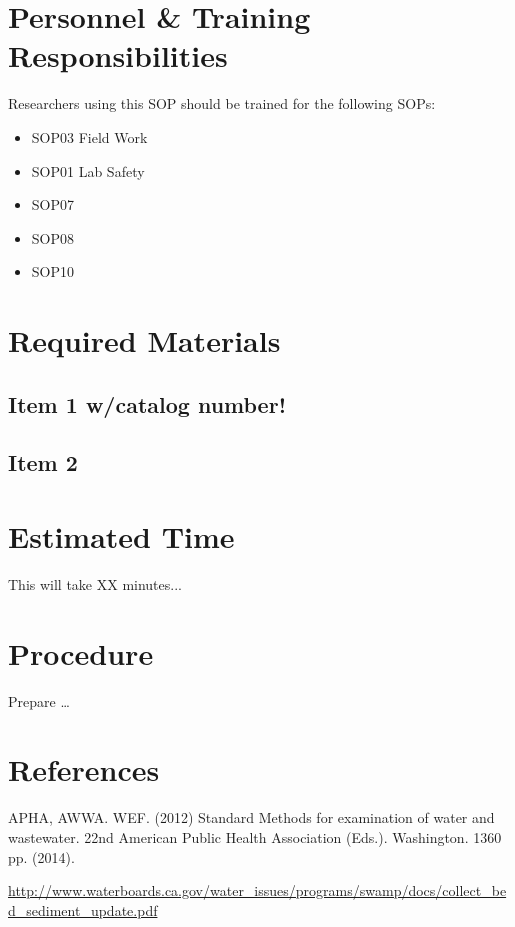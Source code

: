 \documentclass[12pt]{../SOP3_beta}
\begin{document}
\section{Personnel \& Training Responsibilities}

Researchers using this SOP should be trained for the following SOPs:

\begin{itemize}
  \item SOP03 Field Work
  \item SOP01 Lab Safety
  \item SOP07
  \item SOP08
  \item SOP10
\end{itemize}

\section{Required Materials}

\subsection{Item 1 w/catalog number!}
\subsection{Item 2}

\section{Estimated Time}

\NP This will take XX minutes...

\section{Procedure}

\NP Prepare \dots

\NP

\section{References}

\NP APHA, AWWA. WEF. (2012) Standard Methods for examination of water and wastewater. 22nd American Public Health Association (Eds.). Washington. 1360 pp. (2014).

\NP \url{http://www.waterboards.ca.gov/water_issues/programs/swamp/docs/collect_bed_sediment_update.pdf}
\end{document}
